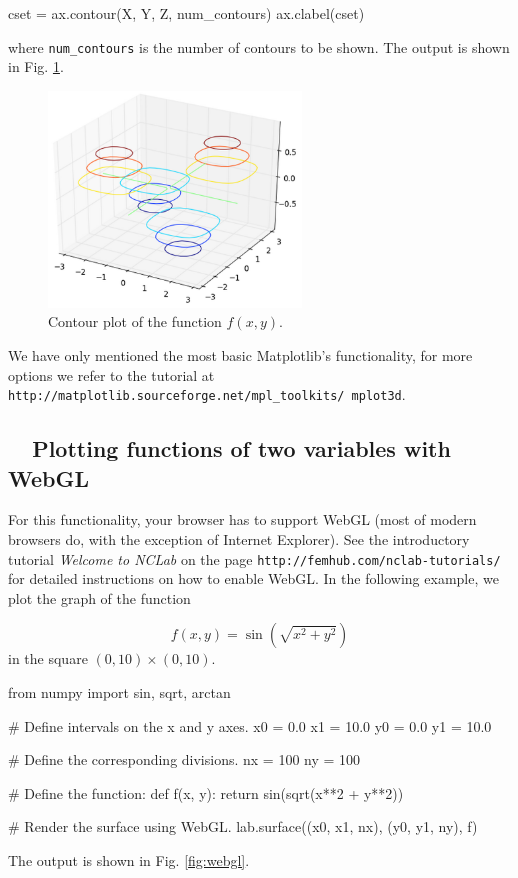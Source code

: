 \begin{bluecode}
cset = ax.contour(X, Y, Z, num_contours)
ax.clabel(cset)
\end{bluecode}
where {\tt num\_contours} is the number of contours to be shown.
The output is shown in Fig. \ref{fig:plot3d-4}.

\begin{figure}[!ht]
\begin{center}
\includegraphics[width=0.6\textwidth]{imgp/plot3d-4.png}
\end{center}
\vspace{-4mm}
\caption{Contour plot of the function $f(x, y)$.}
\label{fig:plot3d-4}
\end{figure}
\noindent
We have only mentioned the most basic Matplotlib's functionality, for more options 
we refer to the tutorial 
at {\tt http://matplotlib.sourceforge.net/mpl\_toolkits/ mplot3d}.


\subsection{\ \ Plotting functions of two variables with WebGL}

For this functionality, your browser has to support WebGL (most of modern browsers do, 
with the exception of Internet Explorer). See the introductory tutorial {\em Welcome to NCLab}
on the page {\tt http://femhub.com/nclab-tutorials/} for detailed instructions on how to enable WebGL. 
In the following example, we plot the graph of the function 

$$
  f(x, y) = \sin(\sqrt{x^2 + y^2})
$$
in the square $(0, 10) \times (0, 10)$.

\begin{bluecode}
from numpy import sin, sqrt, arctan

# Define intervals on the x and y axes.
x0 = 0.0
x1 = 10.0
y0 = 0.0
y1 = 10.0

# Define the corresponding divisions.
nx = 100
ny = 100

# Define the function:
def f(x, y):
    return sin(sqrt(x**2 + y**2))

# Render the surface using WebGL.
lab.surface((x0, x1, nx), (y0, y1, ny), f)
\end{bluecode}
The output is shown in Fig. \ref{fig:webgl}.

